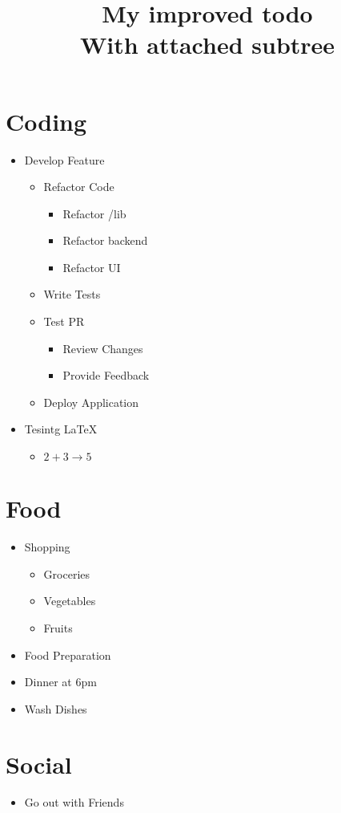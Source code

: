\documentclass{article}
\title{
  My improved todo\\\large{
    With attached subtree
  }
}
\begin{document}
\maketitle


\section{Coding}
\begin{itemize}
  \item Develop Feature
  \begin{itemize}
    \item Refactor Code
    \begin{itemize}
      \item Refactor /lib
      \item Refactor backend
      \item Refactor UI
    \end{itemize}
    \item Write Tests
    \item Test PR
    \begin{itemize}
      \item Review Changes
      \item Provide Feedback
    \end{itemize}
    \item Deploy Application
  \end{itemize}
  \item Tesintg LaTeX
  \begin{itemize}
    \item $2 + 3 \rightarrow 5$
  \end{itemize}
\end{itemize}
\section{Food}
\begin{itemize}
  \item Shopping
  \begin{itemize}
    \item Groceries
    \item Vegetables
    \item Fruits
  \end{itemize}
  \item Food Preparation
  \item Dinner at 6pm
  \item Wash Dishes
\end{itemize}
\section{Social}
\begin{itemize}
  \item Go out with Friends
\end{itemize}


\end{document}
